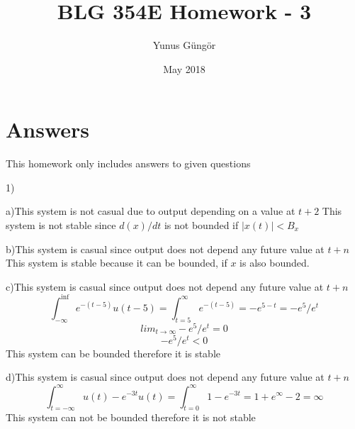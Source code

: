 \documentclass{article}
\title{BLG 354E Homework - 3}
\author{Yunus Güngör }
\date{May 2018}
\begin{document}
	
	\maketitle
	
	\section{Answers}
	
	This homework only includes answers to given questions
	
	1)\par
	a)This system is not casual due to output depending on a value at $t+2$
	This system is not stable since $d(x)/dt$ is not bounded if $|x(t)|<B_x$ 
	\par 
	b)This system is casual since output does not depend any future value at $t+n$
	This system is stable because it can be bounded, if $x$ is also bounded.
	\par 
	c)This system is casual since output does not depend any future value at $t+n$
	$$\int_{-\infty}^{\inf}e^{-(t-5)}u(t-5)=\int_{t=5}^{\infty}e^{-(t-5)}=-e^{5-t}=-e^5/e^t$$
	$$lim_{t\rightarrow \infty}-e^5/e^t=0$$
	$$-e^5/e^t<0$$
	This system can be bounded therefore it is stable
	\par 
	d)This system is casual since output does not depend any future value at $t+n$
	$$\int_{t=-\infty}^{\infty}u(t)-e^{-3t}u(t)=\int_{t=0}^{\infty}1-e^{-3t}=1+e^{\infty}-2=\infty$$
	This system can not be bounded therefore it is not stable
	\par
	
\end{document}
